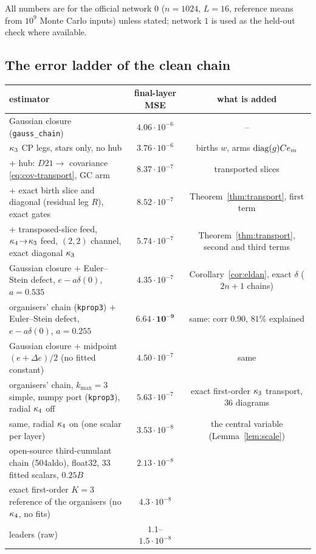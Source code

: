 \label{sec:measure}
All numbers are for the official network $0$ ($n=1024$, $L=16$, reference means from $10^9$ Monte Carlo inputs)
unless stated; network $1$ is used as the held-out check where available.

\subsection{The error ladder of the clean chain}
\begin{center}\small
\begin{tabular}{lcc}\toprule
estimator & final-layer MSE & what is added\\\midrule
Gaussian closure (\texttt{gauss\_chain}) & $4.06\cdot10^{-6}$ & --\\
$\kappa_3$ CP legs, stars only, no hub & $3.76\cdot10^{-6}$ & births $w$, arms $\operatorname{diag}(g)Ce_m$\\
$+$ hub: $D21\to$ covariance \eqref{eq:cov-transport}, GC arm & $8.37\cdot10^{-7}$ & transported slices\\
$+$ exact birth slice and diagonal (residual leg $R$), exact gates & $8.52\cdot10^{-7}$ & Theorem~\ref{thm:transport}, first term\\
$+$ transposed-slice feed, $\kappa_4\!\to\!\kappa_3$ feed, $(2,2)$ channel, exact diagonal $\kappa_3$ & $5.74\cdot10^{-7}$ & Theorem~\ref{thm:transport}, second and third terms\\
Gaussian closure $+$ Euler--Stein defect, $e-a\delta(0)$, $a=0.535$ & $4.35\cdot10^{-7}$ & Corollary~\ref{cor:eldan}, exact $\delta$ ($2n+1$ chains)\\
organisers' chain (\texttt{kprop3}) $+$ Euler--Stein defect, $e-a\delta(0)$, $a=0.255$ & $\mathbf{6.64\cdot10^{-9}}$ & same: corr $0.90$, $81\%$ explained\\
Gaussian closure $+$ midpoint $(e+\Delta e)/2$ (no fitted constant) & $4.50\cdot10^{-7}$ & same\\\midrule
organisers' chain, $k_{\max}=3$ simple, numpy port (\texttt{kprop3}), radial $\kappa_4$ off & $5.63\cdot10^{-7}$ & exact first-order $\kappa_3$ transport, 36 diagrams\\
same, radial $\kappa_4$ on (one scalar per layer) & $3.53\cdot10^{-8}$ & the central variable (Lemma~\ref{lem:scale})\\\midrule
open-source third-cumulant chain (504aldo), float32, $33$ fitted scalars, $0.25B$ & $2.13\cdot10^{-8}$ & \\
exact first-order $K=3$ reference of the organisers (no $\kappa_4$, no fits) & $4.3\cdot10^{-8}$ & \\
leaders (raw) & $1.1$--$1.5\cdot10^{-8}$ & \\\bottomrule
\end{tabular}
\end{center}
